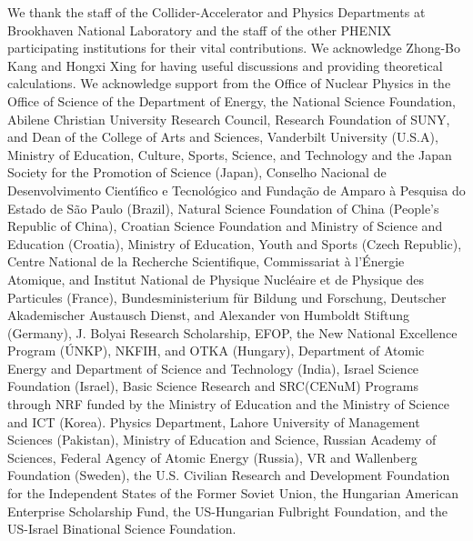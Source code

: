 \documentclass[twocolumn,letterpaper,aps,prc,longbibliography,superscriptaddress,nofootinbib,floatfix]{revtex4-2}
\begin{document}
\begin{acknowledgments}

We thank the staff of the Collider-Accelerator and Physics
Departments at Brookhaven National Laboratory and the staff of
the other PHENIX participating institutions for their vital
contributions.  
We acknowledge Zhong-Bo Kang and Hongxi Xing for having useful discussions and providing theoretical calculations.
We acknowledge support from the
Office of Nuclear Physics in the
Office of Science of the Department of Energy,
the National Science Foundation,
Abilene Christian University Research Council,
Research Foundation of SUNY, and
Dean of the College of Arts and Sciences, Vanderbilt University
(U.S.A),
Ministry of Education, Culture, Sports, Science, and Technology
and the Japan Society for the Promotion of Science (Japan),
Conselho Nacional de Desenvolvimento Cient\'{\i}fico e
Tecnol{\'o}gico and Funda\c c{\~a}o de Amparo {\`a} Pesquisa do
Estado de S{\~a}o Paulo (Brazil),
Natural Science Foundation of China (People's Republic of China),
Croatian Science Foundation and
Ministry of Science and Education (Croatia),
Ministry of Education, Youth and Sports (Czech Republic),
Centre National de la Recherche Scientifique, Commissariat
{\`a} l'{\'E}nergie Atomique, and Institut National de Physique
Nucl{\'e}aire et de Physique des Particules (France),
Bundesministerium f\"ur Bildung und Forschung, Deutscher Akademischer
Austausch Dienst, and Alexander von Humboldt Stiftung (Germany),
J. Bolyai Research Scholarship, EFOP, the New National Excellence
Program ({\'U}NKP), NKFIH, and OTKA (Hungary),
Department of Atomic Energy and Department of Science and Technology
(India),
Israel Science Foundation (Israel),
Basic Science Research and SRC(CENuM) Programs through NRF
funded by the Ministry of Education and the Ministry of
Science and ICT (Korea).
Physics Department, Lahore University of Management Sciences (Pakistan),
Ministry of Education and Science, Russian Academy of Sciences,
Federal Agency of Atomic Energy (Russia),
VR and Wallenberg Foundation (Sweden),
the U.S. Civilian Research and Development Foundation for the
Independent States of the Former Soviet Union,
the Hungarian American Enterprise Scholarship Fund,
the US-Hungarian Fulbright Foundation,
and the US-Israel Binational Science Foundation.

\end{acknowledgments}


   
\end{document}
